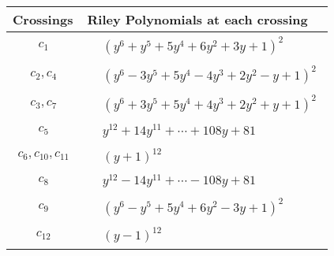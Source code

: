 \documentclass[1p]{elsarticle_modified}
\theoremstyle{definition}
\begin{document}
\begin{tabular}{m{50pt}|m{274pt}}
Crossings & \hspace{64pt}Riley Polynomials at each crossing \\
\hline $$\begin{aligned}c_{1}\end{aligned}$$&$\begin{aligned}
&(y^6+y^5+5 y^4+6 y^2+3 y+1)^2
\end{aligned}$\\
\hline $$\begin{aligned}c_{2},c_{4}\end{aligned}$$&$\begin{aligned}
&(y^6-3 y^5+5 y^4-4 y^3+2 y^2- y+1)^2
\end{aligned}$\\
\hline $$\begin{aligned}c_{3},c_{7}\end{aligned}$$&$\begin{aligned}
&(y^6+3 y^5+5 y^4+4 y^3+2 y^2+y+1)^2
\end{aligned}$\\
\hline $$\begin{aligned}c_{5}\end{aligned}$$&$\begin{aligned}
&y^{12}+14 y^{11}+\cdots+108 y+81
\end{aligned}$\\
\hline $$\begin{aligned}c_{6},c_{10},c_{11}\end{aligned}$$&$\begin{aligned}
&(y+1)^{12}
\end{aligned}$\\
\hline $$\begin{aligned}c_{8}\end{aligned}$$&$\begin{aligned}
&y^{12}-14 y^{11}+\cdots-108 y+81
\end{aligned}$\\
\hline $$\begin{aligned}c_{9}\end{aligned}$$&$\begin{aligned}
&(y^6- y^5+5 y^4+6 y^2-3 y+1)^2
\end{aligned}$\\
\hline $$\begin{aligned}c_{12}\end{aligned}$$&$\begin{aligned}
&(y-1)^{12}
\end{aligned}$\\
\hline
\end{tabular}\\~\\
\end{document}
